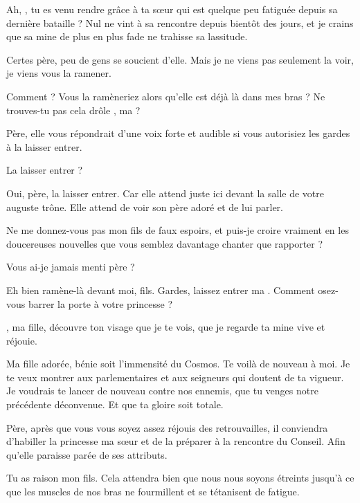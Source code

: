 \begin{drama}

  \roispeaks Ah, \elena, tu es venu rendre grâce à ta sœur qui est quelque peu fatiguée depuis sa dernière bataille ? Nul ne vint à sa rencontre depuis bientôt des jours, et je crains que sa mine de plus en plus fade ne trahisse sa lassitude.

  \elenaspeaks Certes père, peu de gens se soucient d’elle. Mais je ne viens pas seulement la voir, je viens vous la ramener.

  \roispeaks Comment ? Vous la ramèneriez alors qu’elle est déjà là dans mes bras  ?  Ne trouves-tu pas cela drôle \princesse{}, ma \princesse{} ?

  \elenaspeaks Père, elle vous répondrait d’une voix forte et audible si vous autorisiez les gardes à la laisser entrer.

  \elenaspeaks La laisser entrer ?

  \elenaspeaks Oui, père, la laisser entrer. Car elle attend juste ici devant la salle de votre auguste trône. Elle attend de voir son père adoré et de lui parler.


  \roispeaks Ne me donnez-vous pas mon fils de faux espoirs, et puis-je croire vraiment en les doucereuses nouvelles que vous semblez davantage chanter que rapporter ?

  \elenaspeaks Vous ai-je jamais menti père ?

  \roispeaks Eh bien ramène-là devant moi, fils. Gardes, laissez entrer ma \princesse. Comment osez-vous  barrer la porte à votre princesse ?


  \princesse, ma fille, découvre ton visage que je te vois, que je regarde ta mine vive et réjouie.


   Ma fille adorée, bénie soit l’immensité du Cosmos. Te voilà de nouveau à moi. Je te veux montrer aux parlementaires et aux seigneurs qui doutent de ta vigueur. Je voudrais te lancer de nouveau contre nos ennemis, que tu venges notre précédente déconvenue. Et que ta gloire soit totale.

  \elenaspeaks Père, après que vous vous soyez assez réjouis des retrouvailles, il conviendra d’habiller la princesse ma sœur et de la préparer à la rencontre du Conseil. Afin qu’elle paraisse parée de ses attributs.

  \roispeaks Tu as raison mon fils. Cela attendra bien que nous nous soyons étreints jusqu’à ce que les muscles de nos bras ne fourmillent et se tétanisent de fatigue.

\end{drama}

